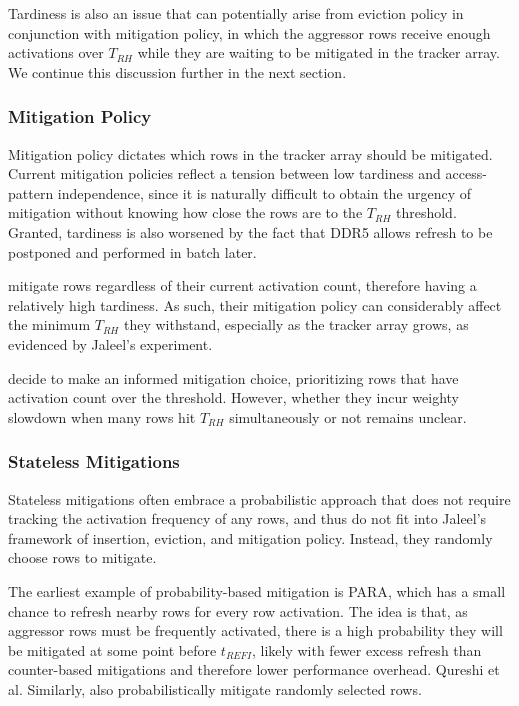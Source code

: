 \documentclass[journal,twocolumn]{IEEEtran}
\begin{document}
	Tardiness is also an issue that can potentially arise from eviction policy in conjunction with mitigation policy, in which the aggressor rows receive enough activations over $T_{RH}$ while they are waiting to be mitigated in the tracker array. We continue this discussion further in the next section.
	
	\subsubsection{Mitigation Policy}
	
	Mitigation policy dictates which rows in the tracker array should be mitigated. Current mitigation policies reflect a tension between low tardiness and access-pattern independence, since it is naturally difficult to obtain the urgency of mitigation without knowing how close the rows are to the $T_{RH}$ threshold. Granted, tardiness is also worsened by the fact that DDR5 allows refresh to be postponed and performed in batch later.
	
	\cite{Demirseren24,Jaleel24} mitigate rows regardless of their current activation count, therefore having a relatively high tardiness. As such, their mitigation policy can considerably affect the minimum $T_{RH}$ they withstand, especially as the tracker array grows, as evidenced by Jaleel's experiment\cite{Jaleel24}.
	
	\cite{Kim23,Bostanci24,Nazaraliyev25} decide to make an informed mitigation choice, prioritizing rows that have activation count over the threshold. However, whether they incur weighty slowdown when many rows hit $T_{RH}$ simultaneously or not remains unclear.
	
	\subsubsection{Stateless Mitigations}
	
	Stateless mitigations often embrace a probabilistic approach that does not require tracking the activation frequency of any rows, and thus do not fit into Jaleel's framework of insertion, eviction, and mitigation policy. Instead, they randomly choose rows to mitigate.
	
	The earliest example of probability-based mitigation is PARA\cite{Kim14}, which has a small chance to refresh nearby rows for every row activation. The idea is that, as aggressor rows must be frequently activated, there is a high probability they will be mitigated at some point before $t_{REFI}$, likely with fewer excess refresh than counter-based mitigations and therefore lower performance overhead. Qureshi et al. Similarly, \cite{Qureshi24,Woo24} also probabilistically mitigate randomly selected rows.
	
\end{document}
